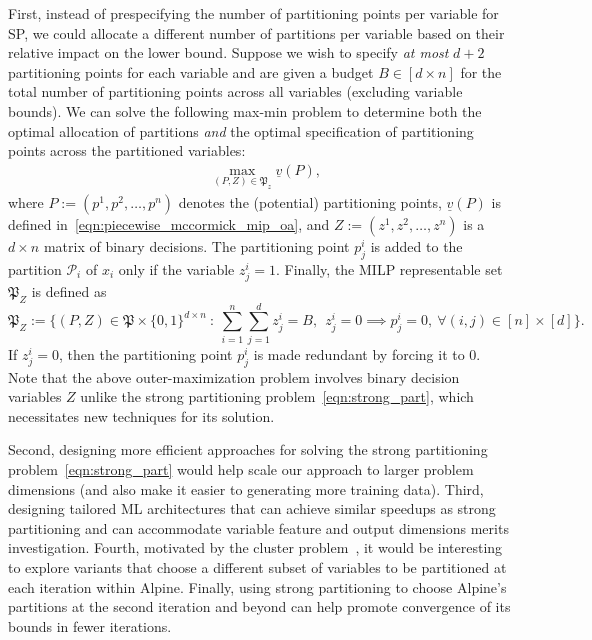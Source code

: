 \documentclass{article}
\newcommand{\pp}{partitioning points}
\begin{document}
First, instead of prespecifying the number of {\pp} per variable for SP, we could allocate a different number of partitions per variable based on their relative impact on the lower bound.
Suppose we wish to specify \textit{at most} $d+2$ {\pp} for each variable and are given a budget $B \in [d \times n]$ for the total number of {\pp} across all variables (excluding variable bounds).
We can solve the following max-min problem to determine both the optimal allocation of partitions \textit{and} the optimal specification of {\pp} across the partitioned variables:
\begin{align*}
&\max_{(P,Z) \in \mathfrak{P}_z} \underline{v}(P),
\end{align*}
where $P := (p^1, p^2, \dots, p^n)$ denotes the (potential) {\pp}, $\underline{v}(P)$ is defined in~\eqref{eqn:piecewise_mccormick_mip_oa}, and $Z := (z^1, z^2, \dots, z^n)$ is a $d \times n$ matrix of binary decisions. The partitioning point $p^i_j$ is added to the partition $\mathcal{P}_i$ of $x_i$ only if the variable $z^i_j = 1$.
Finally, the MILP representable set $\mathfrak{P}_Z$ is defined as
{
\small
\[
\mathfrak{P}_Z := \biggl\{ (P,Z) \in \mathfrak{P} \times \{0,1\}^{d \times n} \: : \: \sum_{i=1}^{n} \sum_{j=1}^{d} z^i_j = B, \:\: z^i_j = 0 \implies p^i_j = 0, \: \forall (i,j) \in [n] \times [d] \biggr\}.
\]
}%
If $z^i_j = 0$, then the partitioning point $p^i_j$ is made redundant by forcing it to $0$.
Note that the above outer-maximization problem involves binary decision variables $Z$ unlike the strong partitioning problem~\eqref{eqn:strong_part}, which necessitates new techniques for its solution.

Second, designing more efficient approaches for solving the strong partitioning problem~\eqref{eqn:strong_part} would help scale our approach to larger problem dimensions (and also make it easier to generating more training data).
Third, designing tailored ML architectures that can achieve similar speedups as strong partitioning and can accommodate variable feature and output dimensions merits investigation.
Fourth, motivated by the cluster problem~\cite{kannan2017cluster,kannan2018convergence}, it would be interesting to explore variants that choose a different subset of variables to be partitioned at each iteration within Alpine.
Finally, using strong partitioning to choose Alpine's partitions at the second iteration and beyond can help promote convergence of its bounds in fewer iterations.
\end{document}
